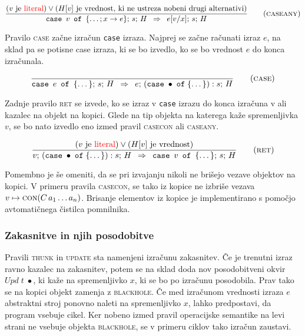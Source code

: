 \begin{equation}
	\infer[caseany]{
		(\text{$v$ je \komentar{literal}}) \lor (\text{$H[v]$ je vrednost, ki ne ustreza nobeni drugi alternativi})
	}{
		\texttt{case} \enspace v \enspace \texttt{of} \enspace \{ \dots; x \to e \}; \, s; \, H
	}{
		e[v/x]; \, s; \, H
	}
\end{equation}

Pravilo \textsc{case} začne izračun \texttt{case} izraza. Najprej se začne računati izraz $e$, na sklad pa se potisne  case izraza, ki se bo izvedlo, ko se bo vrednost $e$ do konca izračunala.

\begin{equation}
	\infer[case]{}{
		\texttt{case} \enspace e \enspace \texttt{of} \enspace \{ \dots \}; \, s; \, H
	}{
		e; \, (\texttt{case} \; \bullet \; \texttt{of} \; \{ \dots \}) : s; \, H
	}
\end{equation}

Zadnje pravilo \textsc{ret} se izvede, ko se izraz v \texttt{case} izrazu do konca izračuna v  ali kazalec na objekt na kopici. Glede na tip objekta na katerega kaže spremenljivka $v$, se bo nato izvedlo eno izmed pravil \textsc{casecon} ali \textsc{caseany}.

\begin{equation}
	\infer[ret]{
		(\text{$v$ je \komentar{literal}}) \lor (\text{$H[v]$ je vrednost})
	}{
		v; \, (\texttt{case} \; \bullet \; \texttt{of} \; \{ \dots \}) : s; \, H
	}{
		\texttt{case} \enspace v \enspace \texttt{of} \enspace \{ \dots \}; \, s; \, H
	}
\end{equation}

Pomembno je še omeniti, da se pri izvajanju nikoli ne brišejo vezave objektov na kopici. V primeru pravila \textsc{casecon}, se tako iz kopice ne izbriše vezava $v \mapsto \textsc{con}(C \, a_1 \dots a_n)$. Brisanje elementov iz kopice je implementirano s pomočjo avtomatičnega čistilca pomnilnika.

\subsubsection{Zakasnitve in njih posodobitve}

Pravili \textsc{thunk} in \textsc{update} sta namenjeni izračunu zakasnitev. Če je trenutni izraz ravno kazalec na zakasnitev, potem se na sklad doda nov posodobitveni okvir $\textit{Upd} \; t \; \bullet$, ki kaže na spremenljivko $x$, ki se bo po izračunu posodobila. Prav tako se na kopici objekt zamenja z \textsc{blackhole}. Če med izračunom vrednosti izraza $e$ abstraktni stroj ponovno naleti na spremenljivko $x$, lahko predpostavi, da program vsebuje cikel. Ker nobeno izmed pravil operacijske semantike na levi strani ne vsebuje objekta \textsc{blackhole}, se v primeru ciklov tako izračun zaustavi.

